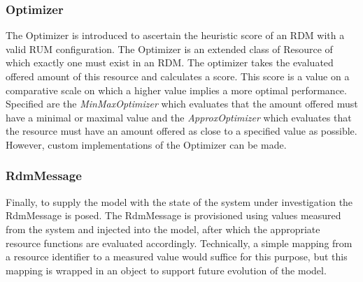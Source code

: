 \subsubsection{Optimizer}
The Optimizer is introduced to ascertain the heuristic score of an RDM with a valid RUM configuration. The Optimizer is an extended class of Resource of which exactly one must exist in an RDM. The optimizer takes the evaluated offered amount of this resource and calculates a score. This score is a value on a comparative scale on which a higher value implies a more optimal performance. Specified are the \emph{MinMaxOptimizer} which evaluates that the amount offered must have a minimal or maximal value and the \emph{ApproxOptimizer} which evaluates that the resource must have an amount offered as close to a specified value as possible. However, custom implementations of the Optimizer can be made.

\subsubsection{RdmMessage}
Finally, to supply the model with the state of the system under investigation the RdmMessage is posed. The RdmMessage is provisioned using values measured from the system and injected into the model, after which the appropriate resource functions are evaluated accordingly. Technically, a simple mapping from a resource identifier to a measured value would suffice for this purpose, but this mapping is wrapped in an object to support future evolution of the model.

